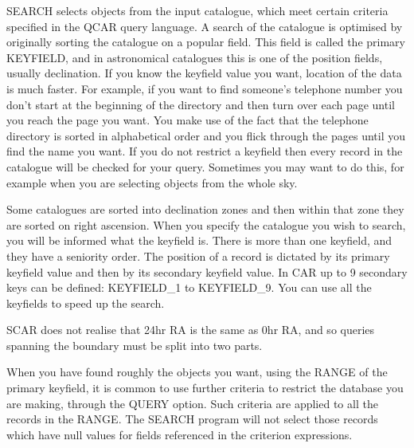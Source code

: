 SEARCH selects objects from the input catalogue, which meet certain criteria
specified in the QCAR query language.
A search of the catalogue is optimised by originally sorting the catalogue
on a popular field.
This field is called the primary KEYFIELD, and in astronomical catalogues
this is one of the position fields, usually declination.
If you know the keyfield value you want, location of the data is much faster.
For example, if you want to find someone's telephone number you don't start
at the beginning of the directory and then turn over each page until you
reach the page you want.
You make use of the fact that the telephone directory is sorted in
alphabetical order and you flick through the pages until you find the name
you want.
If you do not restrict a keyfield then every record in the catalogue will be
checked for your query.
Sometimes you may want to do this, for example when you are selecting objects
from the whole sky.

Some catalogues are sorted into declination  zones  and  then  within
that zone they are sorted on right ascension.
When you specify the catalogue you wish to search, you will be informed what
the keyfield is.
There is more than one keyfield, and they have a seniority order.
The position of a record is dictated by its primary keyfield value and then
by its secondary keyfield value.
In CAR up to 9 secondary keys can be defined: KEYFIELD\_1 to KEYFIELD\_9.
You can use all the keyfields to speed up the search.

SCAR does not realise that 24hr RA is the same as 0hr RA, and so queries
spanning the boundary must be split into two parts.

When you have found roughly the objects you want, using the RANGE of the
primary keyfield, it is common to use further criteria to restrict the
database you are making, through the QUERY option.
Such criteria are applied to all the records in the RANGE.
The SEARCH program will not select those records which have null values for
fields referenced in the criterion expressions.

